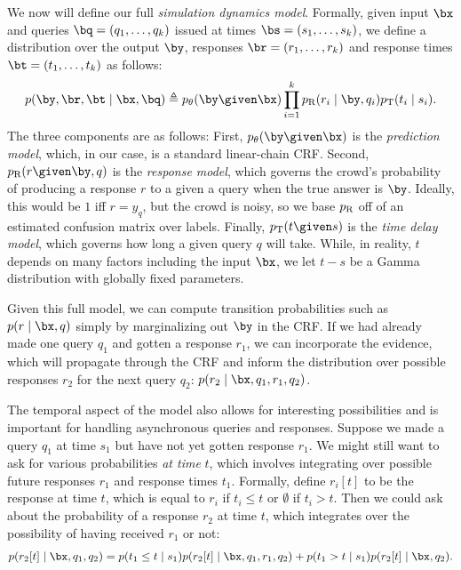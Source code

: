 We now will define our full \emph{simulation dynamics model}.
Formally, given input $\bx$ and queries $\bq = (q_1, \dots, q_k)$ issued at times $\bs = (s_1, \dots, s_k)$,
we define a distribution over the output $\by$, responses $\br = (r_1, \dots, r_k)$
and response times $\bt = (t_1, \dots, t_k)$ as follows:
\begin{align}
  \label{eqn:dynamics}
p(\by, \br, \bt \mid \bx, \bq) \eqdef \p(\by \given \bx) \prod_{i=1}^k \presp(r_i \mid \by, q_i) \ptime(t_i \mid s_i).
\end{align}
The three components are as follows:
First, $\p(\by \given \bx)$ is the \emph{prediction model},
which, in our case, is a standard linear-chain CRF.
Second, $\presp(r \given \by, q)$ is the \emph{response model},
which governs the crowd's probability of producing a response $r$ to a given a query when the true answer is $\by$.
Ideally, this would be $1$ iff $r = y_q$, but the crowd is noisy,
so we base $p_{\text{R}}$ off of an estimated confusion matrix over labels.
Finally, $\ptime(t \given s)$ is the \emph{time delay model},
which governs how long a given query $q$ will take.
While, in reality, $t$ depends on many factors including the input $\bx$,
we let $t - s$ be a Gamma distribution with globally fixed parameters.

Given this full model, we can compute transition probabilities such as $p(r \mid \bx, q)$
simply by marginalizing out $\by$ in the CRF.
If we had already made one query $q_1$ and gotten a response $r_1$,
we can incorporate the evidence, which will propagate through the CRF
and inform the distribution over possible responses $r_2$ for the next query $q_2$:
$p(r_2 \mid \bx, q_1, r_1, q_2)$.

The temporal aspect of the model also allows for interesting possibilities
and is important for handling asynchronous queries and responses.
Suppose we made a query $q_1$ at time $s_1$ but have not yet gotten response $r_1$.
We might still want to ask for various probabilities \emph{at time} $t$,
which involves integrating over possible future responses $r_1$ and response times $t_1$.
Formally, define $r_i[t]$ to be the response at time $t$, which is equal to $r_i$ if $t_i \le t$
or $\emptyset$ if $t_i > t$.
Then we could ask about the probability of a response $r_2$ at time $t$,
which integrates over the possibility of having received $r_1$ or not:
\begin{align}
p(r_2[t] \mid \bx, q_1, q_2) = p(t_1 \le t \mid s_1) p(r_2[t] \mid \bx, q_1, r_1, q_2) + p(t_1 > t \mid s_1) p(r_2[t] \mid \bx, q_2).
\end{align}

